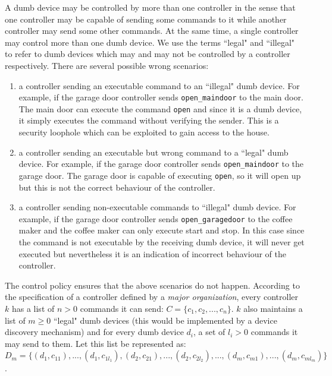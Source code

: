 \documentclass{article}
\begin{document}
A dumb device may be controlled by more than one controller in the sense that one controller may be capable of sending some commands to it while another controller may send some other commands. At the same time, a single controller may control more than one dumb device. We use the terms ``legal" and ``illegal" to refer to dumb devices which may and may not be controlled by a controller respectively.
There are several possible wrong scenarios:
\begin{enumerate}
\item a controller sending an executable command to an ``illegal" dumb device. For example, if the garage door controller sends \texttt{open\_maindoor} to the main door. The main door can execute the command \texttt{open} and since it is a dumb device, it simply executes the command without verifying the sender. This is a security loophole which can be exploited to gain access to the house. 

\item a controller sending an executable but wrong command to a ``legal" dumb device. For example, if the garage door controller sends \texttt{open\_maindoor} to the garage door. The garage door is capable of executing \texttt{open}, so it will open up but this is not the correct behaviour of the controller.

\item a controller sending non-executable commands to ``illegal" dumb device. For example, if the garage door controller sends \texttt{open\_garagedoor} to the coffee maker and the coffee maker can only execute start and stop. In this case since the command is not executable by the receiving dumb device, it  will never get executed but nevertheless it is an indication of incorrect behaviour of the controller.   
\end{enumerate}

The control policy ensures that the above scenarios do not happen. According to the specification of a controller defined by a \textit{major organization}, every controller $k$ has a list of $n > 0$ commands it can send: $ C = \{c_1, c_2, ..., c_n\}$. $k$ also maintains a list of $m \geq 0$ ``legal" dumb devices (this would be implemented by a device discovery mechanism) and for every dumb device $d_i$,  a set of $l_i > 0$ commands it may send to them. Let this list be represented as: \\ $D_{m}= \{(d_{1}, c_{11}), ..., (d_{1}, c_{1l_1}), (d_{2}, c_{21}), ..., (d_{2}, c_{2l_2}), ..., (d_{m}, c_{m1}), ..., (d_m, c_{ml_m})\}$. \\
\end{document}
